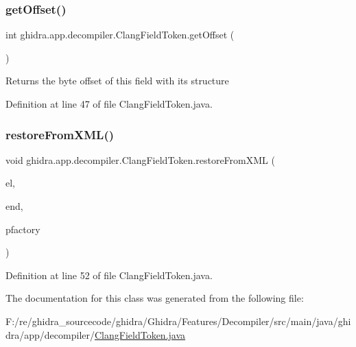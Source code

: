 \subsubsection{\texorpdfstring{getOffset()}{getOffset()}}
{\footnotesize\ttfamily int ghidra.\+app.\+decompiler.\+Clang\+Field\+Token.\+get\+Offset (\begin{DoxyParamCaption}\item[{void}]{ }\end{DoxyParamCaption})\hspace{0.3cm}{\ttfamily [inline]}}

\begin{DoxyReturn}{Returns}
the byte offset of this field with its structure 
\end{DoxyReturn}


Definition at line 47 of file Clang\+Field\+Token.\+java.

\mbox{\label{classghidra_1_1app_1_1decompiler_1_1_clang_field_token_af479ed4013fc92d4529889d0c08d0ffc}} 
\subsubsection{\texorpdfstring{restoreFromXML()}{restoreFromXML()}}
{\footnotesize\ttfamily void ghidra.\+app.\+decompiler.\+Clang\+Field\+Token.\+restore\+From\+X\+ML (\begin{DoxyParamCaption}\item[{Xml\+Element}]{el,  }\item[{Xml\+Element}]{end,  }\item[{Pcode\+Factory}]{pfactory }\end{DoxyParamCaption})\hspace{0.3cm}{\ttfamily [inline]}}



Definition at line 52 of file Clang\+Field\+Token.\+java.



The documentation for this class was generated from the following file\+:\begin{DoxyCompactItemize}
\item 
F\+:/re/ghidra\+\_\+sourcecode/ghidra/\+Ghidra/\+Features/\+Decompiler/src/main/java/ghidra/app/decompiler/\mbox{\hyperlink{_clang_field_token_8java}{Clang\+Field\+Token.\+java}}\end{DoxyCompactItemize}
